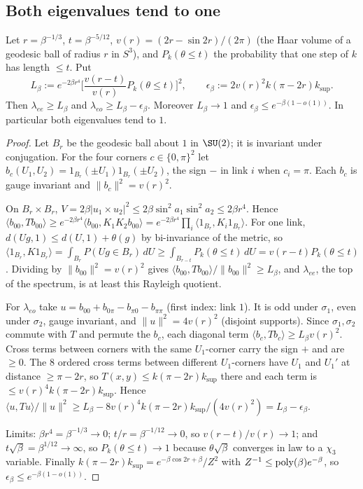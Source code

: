 \subsection{Both eigenvalues tend to one}

\begin{lemma}[L4]\label{tu:L-L4}
Let $r=\beta^{-1/3}$, $t=\beta^{-5/12}$, $v(r)=(2r-\sin2r)/(2\pi)$ (the Haar volume of a geodesic
ball of radius $r$ in $S^3$), and $P_k(\theta\le t)$ the probability that one step of $k$ has
length $\le t$. Put
\[
L_\beta:=e^{-2\beta r^4}\Big[\frac{v(r-t)}{v(r)}P_k(\theta\le t)\Big]^2,\qquad
\epsilon_\beta:=2v(r)^2k(\pi-2r)k_{\sup}.
\]
Then $\lambda_{ee}\ge L_\beta$ and $\lambda_{eo}\ge L_\beta-\epsilon_\beta$. Moreover $L_\beta\to1$ and
$\epsilon_\beta\le e^{-\beta(1-o(1))}$. In particular both eigenvalues tend to $1$.
\end{lemma}

\begin{proof}
Let $B_r$ be the geodesic ball about $1$ in $\SU(2)$; it is invariant under conjugation. For the four
corners $c\in\{0,\pi\}^2$ let $b_c(U_1,U_2)=1_{B_r}(\pm U_1)1_{B_r}(\pm U_2)$, the sign $-$ in link
$i$ when $c_i=\pi$. Each $b_c$ is gauge invariant and $\|b_c\|^2=v(r)^2$.

On $B_r\times B_r$, $V=2\beta|u_1\times u_2|^2\le2\beta\sin^2a_1\sin^2a_2\le2\beta r^4$. Hence
$\langle b_{00},Tb_{00}\rangle\ge e^{-2\beta r^4}\langle b_{00},K_1K_2b_{00}\rangle
=e^{-2\beta r^4}\prod_i\langle1_{B_r},K_i1_{B_r}\rangle$. For one link, $d(Ug,1)\le d(U,1)+\theta(g)$
by bi-invariance of the metric, so
$\langle1_{B_r},K1_{B_r}\rangle=\int_{B_r}P(Ug\in B_r)\,dU\ge\int_{B_{r-t}}P_k(\theta\le t)\,dU=v(r-t)P_k(\theta\le t)$.
Dividing by $\|b_{00}\|^2=v(r)^2$ gives $\langle b_{00},Tb_{00}\rangle/\|b_{00}\|^2\ge L_\beta$, and
$\lambda_{ee}$, the top of the spectrum, is at least this Rayleigh quotient.

For $\lambda_{eo}$ take $u=b_{00}+b_{0\pi}-b_{\pi0}-b_{\pi\pi}$ (first index: link $1$). It is odd under
$\sigma_1$, even under $\sigma_2$, gauge invariant, and $\|u\|^2=4v(r)^2$ (disjoint supports). Since
$\sigma_1,\sigma_2$ commute with $T$ and permute the $b_c$, each diagonal term
$\langle b_c,Tb_c\rangle\ge L_\beta v(r)^2$. Cross terms between corners with the same $U_1$-corner
carry the sign $+$ and are $\ge0$. The $8$ ordered cross terms between different $U_1$-corners have
$U_1$ and $U_1'$ at distance $\ge\pi-2r$, so $T(x,y)\le k(\pi-2r)k_{\sup}$ there and each term is
$\le v(r)^4k(\pi-2r)k_{\sup}$. Hence
$\langle u,Tu\rangle/\|u\|^2\ge L_\beta-8v(r)^4k(\pi-2r)k_{\sup}/(4v(r)^2)=L_\beta-\epsilon_\beta$.

Limits: $\beta r^4=\beta^{-1/3}\to0$; $t/r=\beta^{-1/12}\to0$, so $v(r-t)/v(r)\to1$; and
$t\sqrt\beta=\beta^{1/12}\to\infty$, so $P_k(\theta\le t)\to1$ because $\theta\sqrt\beta$ converges in
law to a $\chi_3$ variable. Finally $k(\pi-2r)k_{\sup}=e^{-\beta\cos2r+\beta}/Z^2$ with
$Z^{-1}\le{\rm poly}(\beta)e^{-\beta}$, so $\epsilon_\beta\le e^{-\beta(1-o(1))}$.
\end{proof}

